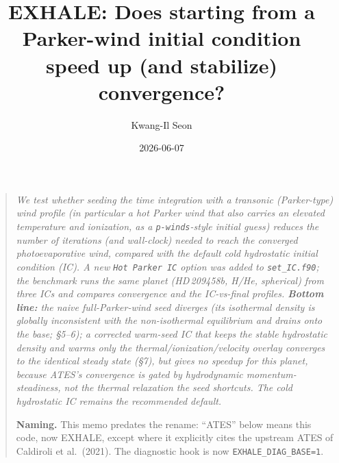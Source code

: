 \documentclass[english,a4paper]{my_memo}
\begin{document}
\title{EXHALE: Does starting from a Parker-wind initial condition\\
       speed up (and stabilize) convergence?}
\author{Kwang-Il Seon}
\date{2026-06-07}
\maketitle

\begin{quote}\small\itshape
We test whether seeding the time integration with a transonic (Parker-type) wind
profile (in particular a \emph{hot} Parker wind that also carries an elevated
temperature and ionization, as a \texttt{p-winds}-style initial guess) reduces
the number of iterations (and wall-clock) needed to reach the converged
photoevaporative wind, compared with the default cold hydrostatic initial
condition (IC). A new \texttt{Hot Parker IC} option was added to
\texttt{set\_IC.f90}; the benchmark runs the same planet (HD\,209458b, H/He,
spherical) from three ICs and compares convergence and the IC-vs-final profiles.
\textbf{Bottom line:} the naive full-Parker-wind seed \emph{diverges} (its isothermal
density is globally inconsistent with the non-isothermal equilibrium and drains onto the
base; \S5--6); a corrected warm-seed IC that keeps the stable hydrostatic density and warms
only the thermal/ionization/velocity overlay \emph{converges to the identical steady state}
(\S7), but gives \emph{no speedup} for this planet, because ATES's convergence is gated by
hydrodynamic momentum-steadiness, not the thermal relaxation the seed shortcuts. The cold
hydrostatic IC remains the recommended default.

\medskip
\textbf{Naming.} This memo predates the rename: ``ATES'' below means this code,
now EXHALE, except where it explicitly cites the upstream ATES of Caldiroli et
al.\ (2021). The diagnostic hook is now \texttt{EXHALE\_DIAG\_BASE=1}.
\end{quote}

\tableofcontents
\bigskip

\end{document}
